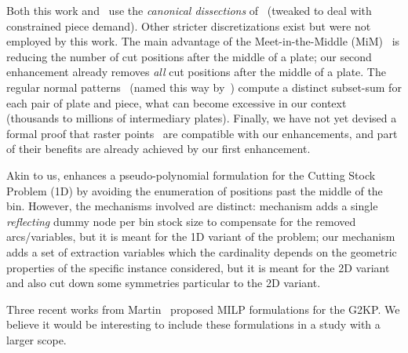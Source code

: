 \documentclass[9pt]{entcs}
\begin{document}
Both this work and~\cite{furini:2016} use the \emph{canonical dissections} of~\cite{herz:1972} (tweaked to deal with constrained piece demand).
Other stricter discretizations exist but were not employed by this work.
The main advantage of the Meet-in-the-Middle (MiM)~\cite{cote:2018} is reducing the number of cut positions after the middle of a plate; our second enhancement already removes \emph{all} cut positions after the middle of a plate.
The regular normal patterns~\cite{boschetti:2002} (named this way by~\cite{cote:2018}) compute a distinct subset-sum for each pair of plate and piece, what can become excessive in our context (thousands to millions of intermediary plates).
Finally, we have not yet devised a formal proof that raster points~\cite{terno:1987,guntram:1966} are compatible with our enhancements, and part of their benefits are already achieved by our first enhancement.

Akin to us, \cite{delorme:2019} enhances a pseudo-polynomial formulation for the Cutting Stock Problem (1D) by avoiding the enumeration of positions past the middle of the bin.
However, the mechanisms involved are distinct: \cite{delorme:2019} mechanism adds a single \emph{reflecting} dummy node per bin stock size to compensate for the removed arcs/variables, but it is meant for the 1D variant of the problem; our mechanism adds a set of extraction variables which the cardinality depends on the geometric properties of the specific instance considered, but it is meant for the 2D variant and also cut down some symmetries particular to the 2D variant.

Three recent works from Martin~\cite{martin:2020:models,martin:2020:top,martin:2020:bottom} proposed MILP formulations for the G2KP.
We believe it would be interesting to include these formulations in a study with a larger scope.

\end{document}
